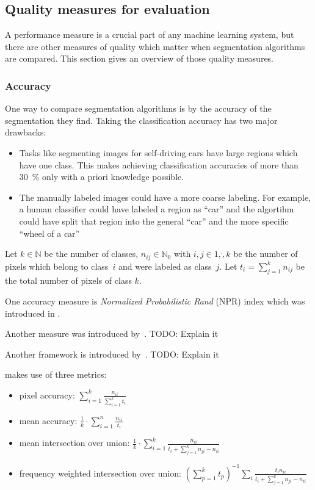 \subsection{Quality measures for evaluation}\label{subsec:quality-measures}

A performance measure is a crucial part of any machine learning system, but
there are other measures of quality which matter when segmentation algorithms
are compared. This section gives an overview of those quality measures.


\subsubsection{Accuracy}
One way to compare segmentation algorithms is by the accuracy of the
segmentation they find. Taking the classification accuracy has two major
drawbacks:

\begin{itemize}
    \item Tasks like segmenting images for self-driving cars have large regions
          which have one class. This makes achieving classification accuracies
          of more than \SI{30}{\percent} only with a priori knowledge possible.
    \item The manually labeled images could have a more coarse labeling. For
          example, a human classifier could have labeled a region as
          \enquote{car} and the algortihm could have split that region into
          the general \enquote{car} and the more specific \enquote{wheel of a
          car}
\end{itemize}

Let $k \in \mathbb{N}$ be the number of classes, $n_{ij} \in \mathbb{N}_0$ with
$i,j \in 1, \dot, k$ be the number of pixels which belong to class~$i$ and were
labeled as class~$j$. Let $t_i = \sum_{j=1}^k n_{ij}$ be the total number of
pixels of class $k$.

One accuracy measure is \textit{Normalized Probabilistic Rand} (NPR) index
which was introduced in \cite{unnikrishnan2005measure}.

Another measure was introduced by~\cite{celebi2009improved}. TODO: Explain it

Another framework is introduced by~\cite{jaber2010probabilistic}. TODO: Explain
it

\cite{long2014fully} makes use of three metrics:

\begin{itemize}
    \item pixel accuracy: $\sum_{i=1}^k \frac{n_{ii}}{\sum_{i=1}^k t_i}$
    \item mean accuracy: $\frac{1}{k} \cdot \sum_{i=1}^n \frac{n_{ii}}{t_i}$
    \item mean intersection over union: $\frac{1}{k} \cdot \sum_{i=1}^k \frac{n_{ii}}{t_i + \sum_{j=1}^k n_{ji}-n_{ii}}$
    \item frequency weighted intersection over union:
          ${({\sum_{p=1}^k t_p})}^{-1} \sum_i \frac{t_i n_{ii}}{t_i + \sum_{j=1}^k n_{ji} - n_{ii}}$
\end{itemize}

